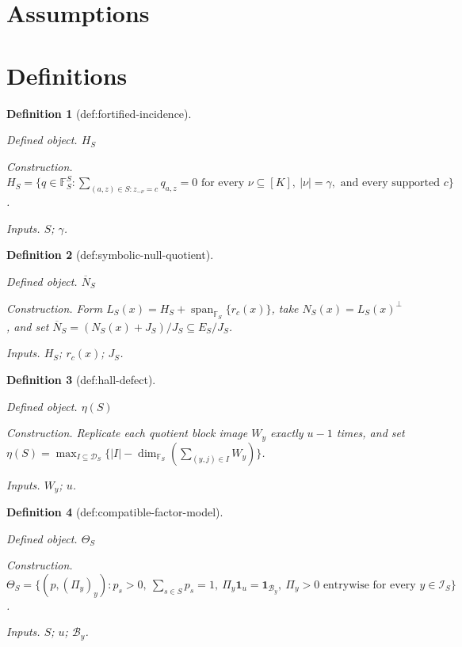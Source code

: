 \documentclass{article}
\newtheorem{definition}{Definition}
\begin{document}
\section{Assumptions}

\section{Definitions}

\begin{definition}[def:fortified-incidence]\label{def:fortified-incidence}
\par\smallskip\noindent\emph{Defined object.} \(H_S\)
\par\smallskip\noindent\emph{Construction.} \(H_S=\{q\in\mathbb F_S^S:\sum_{(a,z)\in S:z_{-\nu}=c}q_{a,z}=0\text{ for every }\nu\subseteq[K],\ |\nu|=\gamma,\text{ and every supported }c\}\).
\par\smallskip\noindent\emph{Inputs.} \(S\); \(\gamma\).
\end{definition}

\begin{definition}[def:symbolic-null-quotient]\label{def:symbolic-null-quotient}
\par\smallskip\noindent\emph{Defined object.} \(\overline N_S\)
\par\smallskip\noindent\emph{Construction.} Form \(L_S(x)=H_S+\operatorname{span}_{\mathbb F_S}\{r_c(x)\}\), take \(N_S(x)=L_S(x)^\perp\), and set \(\overline N_S=(N_S(x)+J_S)/J_S\subseteq E_S/J_S\).
\par\smallskip\noindent\emph{Inputs.} \(H_S\); \(r_c(x)\); \(J_S\).
\end{definition}

\begin{definition}[def:hall-defect]\label{def:hall-defect}
\par\smallskip\noindent\emph{Defined object.} \(\eta(S)\)
\par\smallskip\noindent\emph{Construction.} Replicate each quotient block image \(W_y\) exactly \(u-1\) times, and set \(\eta(S)=\max_{I\subseteq\mathcal D_S}\{|I|-\dim_{\mathbb F_S}(\sum_{(y,j)\in I}W_y)\}\).
\par\smallskip\noindent\emph{Inputs.} \(W_y\); \(u\).
\end{definition}

\begin{definition}[def:compatible-factor-model]\label{def:compatible-factor-model}
\par\smallskip\noindent\emph{Defined object.} \(\Theta_S\)
\par\smallskip\noindent\emph{Construction.} \(\Theta_S=\{(p,(\Pi_y)_y):p_s>0,\ \sum_{s\in S}p_s=1,\ \Pi_y\mathbf 1_u=\mathbf 1_{\mathcal B_y},\ \Pi_y>0\text{ entrywise for every }y\in\mathcal I_S\}\).
\par\smallskip\noindent\emph{Inputs.} \(S\); \(u\); \(\mathcal B_y\).
\end{definition}
\end{document}
